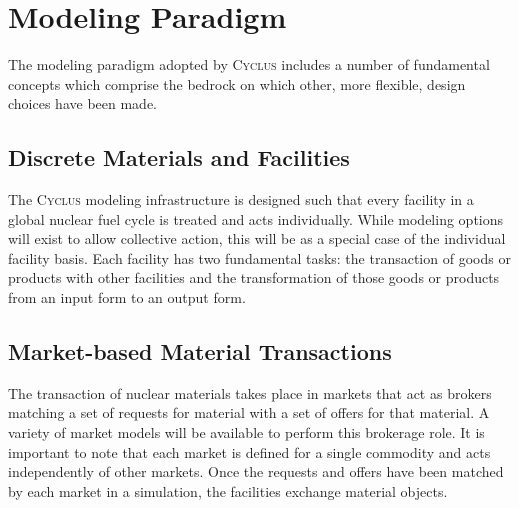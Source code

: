 \documentclass{anstrans}
\newcommand{\Cyclus}{\textsc{Cyclus }}
\begin{document}
\section{Modeling Paradigm}
The modeling paradigm adopted by \Cyclus includes a number of fundamental concepts which comprise the bedrock on which other, more flexible, design choices have been made. %


\subsection{Discrete Materials and Facilities}
The \Cyclus modeling infrastructure is designed such that every facility in a global nuclear fuel cycle is treated and acts individually. While modeling options will exist to allow collective action, this will be as a special case of the individual facility basis. Each facility has two fundamental tasks: the transaction of goods or products with other facilities and the transformation of those goods or products from an input form to an output form. 

\subsection{Market-based Material Transactions}
The transaction of nuclear materials takes place in markets that act as brokers matching a set of requests for material with a set of offers for that material. A variety of market models will be available to perform this brokerage role. It is important to note that each market is defined for a single commodity and acts independently of other markets. Once the requests and offers have been matched by each market in a simulation, the facilities exchange material objects.
\end{document}
